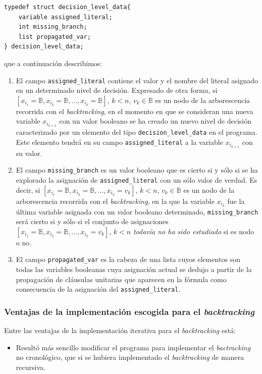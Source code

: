 \documentclass[12pt,lettersize,oneside]{article}
\begin{document}
\begin{lstlisting}
typedef struct decision_level_data{
    variable assigned_literal;
    int missing_branch;                                                
    list propagated_var;
} decision_level_data;
\end{lstlisting}
que a continuación describimos:
\vspace{-2.5mm}
\begin{enumerate}
\item El campo {\tt assigned\_literal} contiene el valor y el nombre del literal
  asignado en un determinado nivel de decisión. Expresado de otra forma, si
  $[x_{i_1}=\mathbb{B},x_{i_2}=\mathbb{B},\ldots, x_{i_k} = \mathbb{B} ]$, $k<
  n$, $v_k \in \mathbb{B}$ es un nodo de la arborescencia recorrida con el
  \emph{backtracking}, en el momento en que se consideran una nueva variable
  $x_{i_{k+1}}$ con un valor booleano se ha creado un nuevo nivel de decisión
  caracterizado por un elemento del tipo {\tt decision\_level\_data} en el
  programa. Este elemento tendrá en su campo {\tt assigned\_literal} a la
  variable $x_{i_{k+1}}$ con su valor.
\item El campo {\tt missing\_branch} es un valor booleano que es cierto si y
  sólo si se ha explorado la asignación de {\tt assigned\_literal} con un
  sólo valor de verdad. Es decir, si
  $[x_{i_1}=\mathbb{B},x_{i_2}=\mathbb{B},\ldots, x_{i_k} = v_k ]$, $k< n$, $v_k
  \in \mathbb{B}$ es un nodo de la arborescencia recorrida con el
  \emph{backtracking}, en la que la variable $x_{i_k}$ fue la última variable
  asignada con un valor booleano determinado, {\tt missing\_branch} será cierto
  si y sólo si el conjunto de asignaciones
  $[x_{i_1}=\mathbb{B},x_{i_2}=\mathbb{B},\ldots, x_{i_k} = \overline{v_k} ]$,
  $k<n$ \emph{todavía no ha sido estudiado} si es nodo o no.
\item El campo {\tt propagated\_var} es la cabeza de una lista cuyos elementos
  son todas las variables booleanas cuya asignación actual se dedujo a partir de
  la propagación de cláusulas unitarias que aparecen en la fórmula como
  consecuencia de la asignación del {\tt assigned\_literal}.
\end{enumerate}

\subsubsection{Ventajas de la implementación escogida para el
  \emph{backtracking}}\label{VentajasBacktracking}
Entre las ventajas de la implementación iterativa para el \emph{backtracking} está:
\vspace{-2.5mm}
\begin{itemize}
  \item Resultó más sencillo modificar el programa para implementar el
    \emph{bactracking} no cronológico, que si se hubiera implementado el
    \emph{backtracking} de manera recursiva.
\end{itemize}
\end{document}
